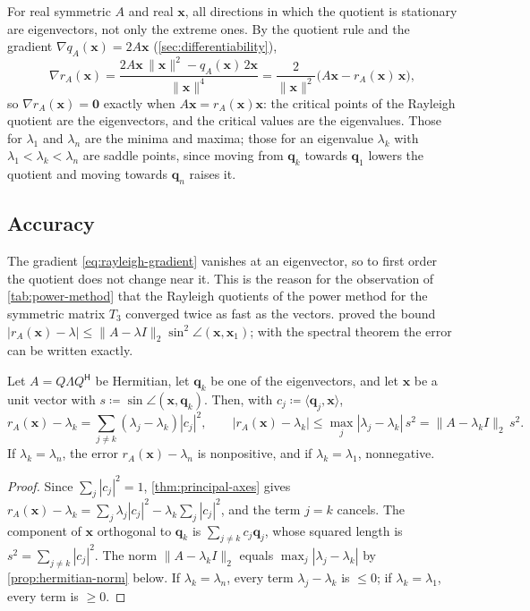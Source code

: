 For real symmetric $A$ and real $\mathbf x$, all directions in which the quotient is stationary are eigenvectors, not only the extreme ones. By the quotient rule and the gradient $\nabla q_A(\mathbf x)=2A\mathbf x$ (\cref{sec:differentiability}),
\begin{equation}
\nabla r_A(\mathbf x)=\frac{2A\mathbf x\,\|\mathbf x\|^2-q_A(\mathbf x)\,2\mathbf x}{\|\mathbf x\|^4}=\frac2{\|\mathbf x\|^2}\bigl(A\mathbf x-r_A(\mathbf x)\,\mathbf x\bigr),
\label{eq:rayleigh-gradient}
\end{equation}
so $\nabla r_A(\mathbf x)=\mathbf 0$ exactly when $A\mathbf x=r_A(\mathbf x)\mathbf x$: the critical points of the Rayleigh quotient are the eigenvectors, and the critical values are the eigenvalues. Those for $\lambda_1$ and $\lambda_n$ are the minima and maxima; those for an eigenvalue $\lambda_k$ with $\lambda_1<\lambda_k<\lambda_n$ are saddle points, since moving from $\mathbf q_k$ towards $\mathbf q_1$ lowers the quotient and moving towards $\mathbf q_n$ raises it.

\subsection{Accuracy}

The gradient \eqref{eq:rayleigh-gradient} vanishes at an eigenvector, so to first order the quotient does not change near it. This is the reason for the observation of \cref{tab:power-method} that the Rayleigh quotients of the power method for the symmetric matrix $T_3$ converged twice as fast as the vectors.  proved the bound $|r_A(\mathbf x)-\lambda|\le\|A-\lambda I\|_2\sin^2\angle(\mathbf x,\mathbf x_1)$; with the spectral theorem the error can be written exactly.

\begin{proposition}
\label{prop:rayleigh-quadratic}
Let $A=Q\Lambda Q^{\mathsf H}$ be Hermitian, let $\mathbf q_k$ be one of the eigenvectors, and let $\mathbf x$ be a unit vector with $s\coloneqq\sin\angle(\mathbf x,\mathbf q_k)$. Then, with $c_j\coloneqq\langle\mathbf q_j,\mathbf x\rangle$,
\[
r_A(\mathbf x)-\lambda_k=\sum_{j\ne k}(\lambda_j-\lambda_k)|c_j|^2,\qquad|r_A(\mathbf x)-\lambda_k|\le\max_j|\lambda_j-\lambda_k|\,s^2=\|A-\lambda_kI\|_2\,s^2 .
\]
If $\lambda_k=\lambda_n$, the error $r_A(\mathbf x)-\lambda_n$ is nonpositive, and if $\lambda_k=\lambda_1$, nonnegative.
\end{proposition}

\begin{proof}
Since $\sum_j|c_j|^2=1$, \cref{thm:principal-axes} gives $r_A(\mathbf x)-\lambda_k=\sum_j\lambda_j|c_j|^2-\lambda_k\sum_j|c_j|^2$, and the term $j=k$ cancels. The component of $\mathbf x$ orthogonal to $\mathbf q_k$ is $\sum_{j\ne k}c_j\mathbf q_j$, whose squared length is $s^2=\sum_{j\ne k}|c_j|^2$. The norm $\|A-\lambda_kI\|_2$ equals $\max_j|\lambda_j-\lambda_k|$ by \cref{prop:hermitian-norm} below. If $\lambda_k=\lambda_n$, every term $\lambda_j-\lambda_k$ is $\le0$; if $\lambda_k=\lambda_1$, every term is $\ge0$.
\end{proof}

